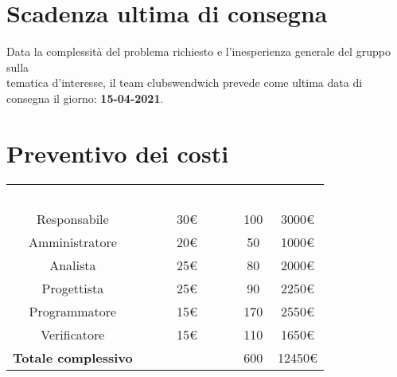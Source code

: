 \section{Scadenza ultima di consegna}
Data la complessità del problema richiesto e l'inesperienza generale del gruppo sulla \\
tematica d'interesse, il team clubswendwich prevede come ultima data di consegna 
il giorno: \textbf{15-04-2021}.

\section{Preventivo dei costi}
{\renewcommand{\arraystretch}{1.5}
\begin{tabular}{cccc}
	\rowcolor[RGB]{33, 73, 50}
	\textcolor{white}{\textbf{Ruolo}} & \textcolor{white}{\textbf{Costo Orario}} 
    & \textcolor{white}{\textbf{Ore}} & \textcolor{white}{\textbf{Totale}}\\
	\rowcolor[RGB]{216, 235, 171}
	Responsabile & 30€ & 100 & 3000€     			\\
	\rowcolor[RGB]{233, 245, 206}
	Amministratore & 20€ & 50 & 1000€    			\\
    \rowcolor[RGB]{216, 235, 171}
	Analista & 25€ & 80 & 2000€          			\\
	\rowcolor[RGB]{233, 245, 206}
	Progettista & 25€ & 90 & 2250€       			\\
    \rowcolor[RGB]{216, 235, 171}
	Programmatore & 15€ & 170 & 2550€     			\\
	\rowcolor[RGB]{233, 245, 206}
	Verificatore & 15€ & 110 & 1650€      			\\
	\rowcolor[RGB]{216, 235, 171}
	\textbf{Totale complessivo} & & 600 & 12450€    \\
\end{tabular}	
}


